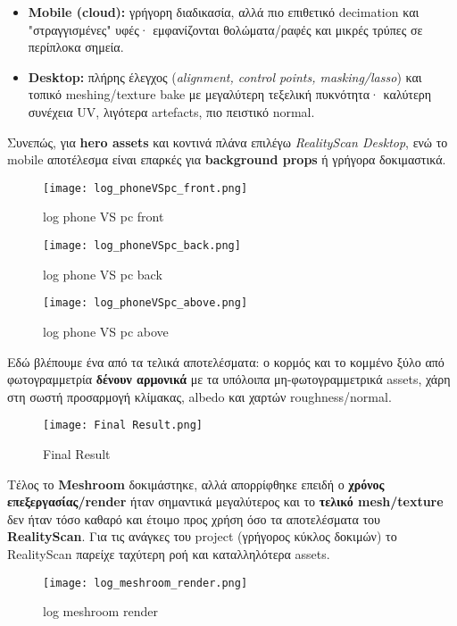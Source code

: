 \begin{itemize}
  \item \textbf{Mobile (cloud):} γρήγορη διαδικασία, αλλά πιο επιθετικό decimation και "στραγγισμένες" υφές· εμφανίζονται θολώματα/ραφές και μικρές τρύπες σε περίπλοκα σημεία.
  \item \textbf{Desktop:} πλήρης έλεγχος (\emph{alignment, control points, masking/lasso}) και τοπικό meshing/texture bake με μεγαλύτερη τεξελική πυκνότητα· καλύτερη συνέχεια UV, λιγότερα artefacts, πιο πειστικό normal.
\end{itemize}

Συνεπώς, για \textbf{hero assets} και κοντινά πλάνα επιλέγω \emph{RealityScan Desktop}, ενώ το mobile αποτέλεσμα είναι επαρκές για \textbf{background props} ή γρήγορα δοκιμαστικά.

\begin{figure}[H]
    \centering
    \texttt{[image: log\_phoneVSpc\_front.png]}
    \caption{log phone VS pc front}
    \label{fig:placeholder}
\end{figure}
\begin{figure}[H]
    \centering
    \texttt{[image: log\_phoneVSpc\_back.png]}
    \caption{log phone VS pc back}
    \label{fig:placeholder}
\end{figure}
\begin{figure}[H]
    \centering
    \texttt{[image: log\_phoneVSpc\_above.png]}
    \caption{log phone VS pc above}
    \label{fig:placeholder}
\end{figure}
Εδώ βλέπουμε ένα από τα τελικά αποτελέσματα: ο κορμός και το κομμένο ξύλο από φωτογραμμετρία \textbf{δένουν αρμονικά} με τα υπόλοιπα μη-φωτογραμμετρικά assets, χάρη στη σωστή προσαρμογή κλίμακας, albedo και χαρτών roughness/normal.

\begin{figure}[H]
    \centering
    \texttt{[image: Final Result.png]}
    \caption{Final Result}
    \label{fig:placeholder}
\end{figure}
Tέλος το \textbf{Meshroom} δοκιμάστηκε, αλλά απορρίφθηκε επειδή ο \textbf{χρόνος επεξεργασίας/render} ήταν σημαντικά μεγαλύτερος και το \textbf{τελικό mesh/texture} δεν ήταν τόσο καθαρό και έτοιμο προς χρήση όσο τα αποτελέσματα του \textbf{RealityScan}. Για τις ανάγκες του project (γρήγορος κύκλος δοκιμών) το RealityScan παρείχε ταχύτερη ροή και καταλληλότερα assets.

\begin{figure}[H]
    \centering
    \texttt{[image: log\_meshroom\_render.png]}
    \caption{log meshroom render}
    \label{fig:placeholder}
\end{figure}

